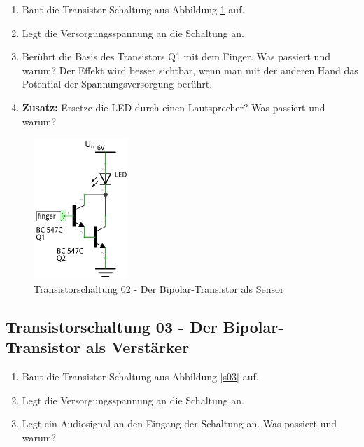 
\begin{enumerate}
    \itemsep1pt\parskip0pt
    \item Baut die Transistor-Schaltung aus Abbildung \ref{s02} auf.
    \item Legt die Versorgungsspannung an die Schaltung an.
    \item Berührt die Basis des Transistors Q1 mit dem Finger. Was passiert und
      warum? Der Effekt wird besser sichtbar, wenn man mit der anderen Hand das
      Potential der Spannungsversorgung berührt. 
    \item \textbf{Zusatz:} Ersetze die LED durch einen Lautsprecher? Was
      passiert und warum? 
\end{enumerate}

\begin{figure}[H]
	\centering
	\includegraphics[scale=1.6]{Transistor/Schaltungen/NPN_Sensor.pdf}
	\caption{Transistorschaltung 02 - Der Bipolar-Transistor als Sensor}
	\label{s02}
\end{figure}


\subsection*{Transistorschaltung 03 - Der Bipolar-Transistor als Verstärker}

\begin{enumerate}
    \itemsep1pt\parskip0pt
    \item Baut die Transistor-Schaltung aus Abbildung \ref{s03} auf.
    \item Legt die Versorgungsspannung an die Schaltung an.
    \item Legt ein Audiosignal an den Eingang der Schaltung an. Was passiert und warum?
\end{enumerate}


